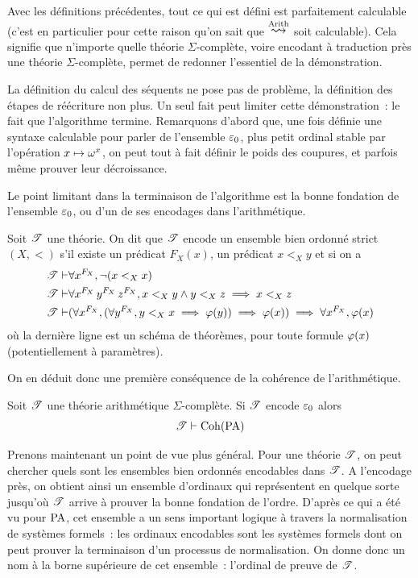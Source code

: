 Avec les définitions précédentes, tout ce qui est défini est parfaitement
calculable (c'est en particulier pour cette raison qu'on sait que
$\reecr{\Arith}$ soit calculable). Cela signifie que n'importe quelle théorie
$\Sigma$-complète, voire encodant à traduction près une théorie
$\Sigma$-complète, permet de redonner l'essentiel de la démonstration.

La définition du calcul des séquents ne pose pas de problème, la définition des
étapes de réécriture non plus. Un seul fait peut limiter cette démonstration~:
le fait que l'algorithme termine. Remarquons d'abord que, une fois définie une
syntaxe calculable pour parler de l'ensemble $\varepsilon_{0}$, plus petit ordinal stable
par l'opération $x \mapsto \omega^x$, on peut tout à fait définir le poids des
coupures, et parfois même prouver leur décroissance.

Le point limitant dans la terminaison de l'algorithme est la bonne fondation de
l'ensemble $\varepsilon_{0}$, ou d'un de ses encodages dans l'arithmétique.

\begin{definition}
  Soit $\mathscr T$ une théorie. On dit que $\mathscr T$ encode un ensemble bien
  ordonné strict $(X,<)$ s'il existe un prédicat $F_X(x)$, un prédicat $x <_X y$
  et si on a
  \begin{align*}
    \mathscr T\vdash& \forall x^{F_X}, \lnot(x <_X x)\\
    \mathscr T\vdash& \forall x^{F_X}\,y^{F_X}\,z^{F_X},
    x <_X y \land y <_X z \implies x <_X z\\
    \mathscr T\vdash& (\forall x^{F_X}, (\forall y^{F_X}, y <_X x \implies
    \varphi(y))\implies \varphi(x))\implies \forall x^{F_X},\varphi(x)
  \end{align*}
  où la dernière ligne est un schéma de théorèmes, pour toute formule
  $\varphi(x)$ (potentiellement à paramètres).
\end{definition}

\noindent
On en déduit donc une première conséquence de la cohérence de l'arithmétique.

\begin{corollary}
  Soit $\mathscr T$ une théorie arithmétique $\Sigma$-complète. Si $\mathscr T$ encode
  $\varepsilon_{0}$ alors
  \[\mathscr T \vdash \operatorname{Coh}(\operatorname{PA})\]
\end{corollary}

Prenons maintenant un point de vue plus général. Pour une théorie $\mathscr T$,
on peut chercher quels sont les ensembles bien ordonnés encodables dans
$\mathscr T$. A l'encodage près, on obtient ainsi un ensemble d'ordinaux qui
représentent en quelque sorte \og jusqu'où $\mathscr T$ arrive à prouver la bonne
fondation de l'ordre\fg. D'après ce qui a été vu pour $\operatorname{PA}$, cet
ensemble a un sens important logique à travers la normalisation de systèmes
formels~: les ordinaux encodables sont les systèmes formels dont on peut
prouver la terminaison d'un processus de normalisation. On donne donc un nom à
la borne supérieure de cet ensemble~: l'ordinal de preuve de $\mathscr T$.

